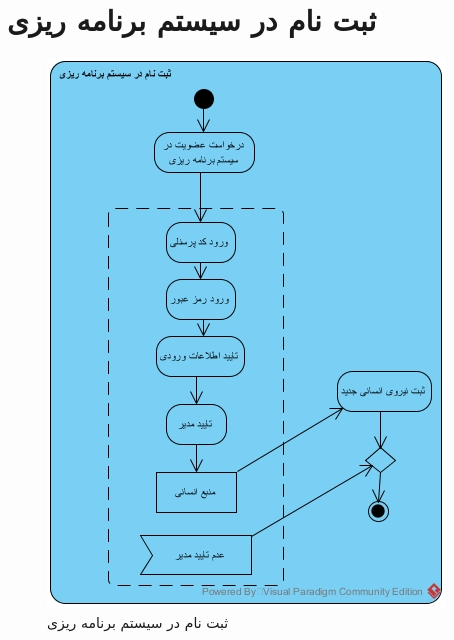 \section{ثبت نام در سیستم برنامه ریزی}
\begin{figure}[H]
	\centering
	\includegraphics[scale=0.8]{img/activity/reg}
	\caption{ثبت نام در سیستم برنامه ریزی}
\end{figure}

